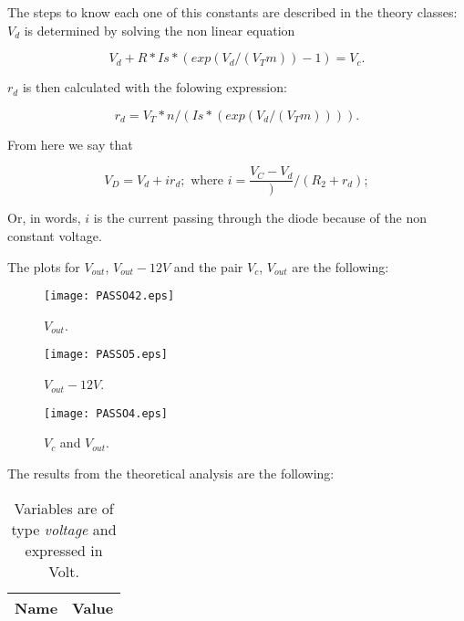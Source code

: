 The steps to know each one of this constants are described in the theory classes:
$V_{d}$ is determined by solving the non linear equation

\begin{equation}
  V_d + R*Is*(exp(V_d/(V_Tm))-1) = V_c.
  \label{eq:Vd}
\end{equation}

$r_{d}$ is then calculated with the folowing expression:

\begin{equation}
  r_{d} = V_T*n/( Is*(exp(V_d/(V_Tm)))).
  \label{eq:Rd}
\end{equation}

From here we say that

\begin{equation}
  V_{D} = V_d + ir_d; \text{ where } i = \frac{V_C-V_d})/(R_2+r_d);
  \label{eq:TEO_VD}
\end{equation}

Or, in words, $i$ is the current passing through the diode because of the non constant voltage.

The plots for $V_{out}$, $V_{out} - 12V$ and the pair $V_c$, $V_{out}$ are the following:

\begin{figure}[h] \centering
\texttt{[image: PASSO42.eps]}
\caption{$V_{out}$.}
\label{fig:TEO_OUT}
\end{figure}

\begin{figure}[h] \centering
\texttt{[image: PASSO5.eps]}
\caption{$V_{out} - 12V$.}
\label{fig:TEO_OUT-12}
\end{figure}

\newpage

\begin{figure}[h] \centering
\texttt{[image: PASSO4.eps]}
\caption{$V_c$ and $V_{out}$.}
\label{fig:TEO_FULL}
\end{figure}

The results from the theoretical analysis are the following:

\begin{table}[h]
  \centering
  \begin{tabular}{|l|r|}
    \hline    
    {\bf Name} & {\bf Value} \\ \hline
    
  \end{tabular}
  \caption{Variables are of type {\em voltage} and expressed in Volt.}
  \label{tab:TEO_RES}
\end{table}